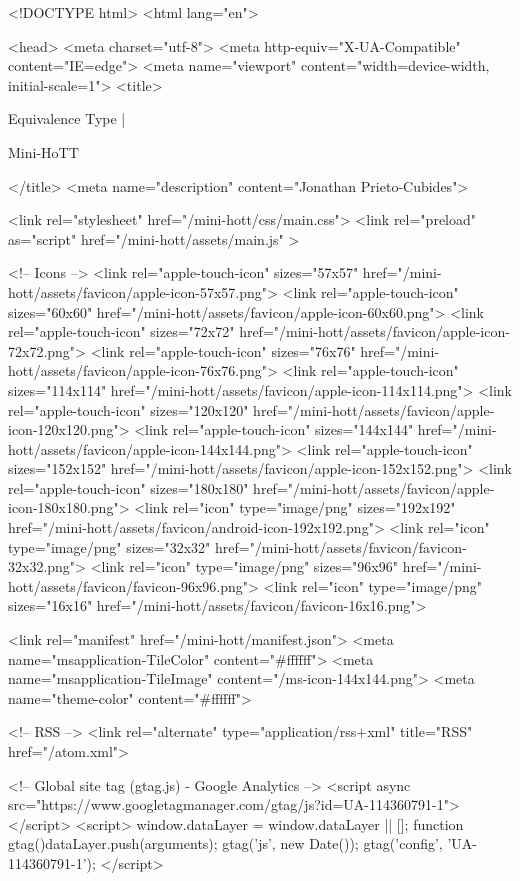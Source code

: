 <!DOCTYPE html>
<html lang="en">

<head>
  <meta charset="utf-8">
  <meta http-equiv="X-UA-Compatible" content="IE=edge">
  <meta name="viewport" content="width=device-width, initial-scale=1">
  <title>
    
      
        Equivalence Type |
      
        Mini-HoTT
    
  </title>
  <meta name="description" content="Jonathan Prieto-Cubides">

  <link rel="stylesheet" href="/mini-hott/css/main.css">
  <link rel="preload" as="script" href="/mini-hott/assets/main.js" >

  <!-- Icons -->
  <link rel="apple-touch-icon" sizes="57x57" href="/mini-hott/assets/favicon/apple-icon-57x57.png">
  <link rel="apple-touch-icon" sizes="60x60" href="/mini-hott/assets/favicon/apple-icon-60x60.png">
  <link rel="apple-touch-icon" sizes="72x72" href="/mini-hott/assets/favicon/apple-icon-72x72.png">
  <link rel="apple-touch-icon" sizes="76x76" href="/mini-hott/assets/favicon/apple-icon-76x76.png">
  <link rel="apple-touch-icon" sizes="114x114" href="/mini-hott/assets/favicon/apple-icon-114x114.png">
  <link rel="apple-touch-icon" sizes="120x120" href="/mini-hott/assets/favicon/apple-icon-120x120.png">
  <link rel="apple-touch-icon" sizes="144x144" href="/mini-hott/assets/favicon/apple-icon-144x144.png">
  <link rel="apple-touch-icon" sizes="152x152" href="/mini-hott/assets/favicon/apple-icon-152x152.png">
  <link rel="apple-touch-icon" sizes="180x180" href="/mini-hott/assets/favicon/apple-icon-180x180.png">
  <link rel="icon" type="image/png" sizes="192x192"  href="/mini-hott/assets/favicon/android-icon-192x192.png">
  <link rel="icon" type="image/png" sizes="32x32" href="/mini-hott/assets/favicon/favicon-32x32.png">
  <link rel="icon" type="image/png" sizes="96x96" href="/mini-hott/assets/favicon/favicon-96x96.png">
  <link rel="icon" type="image/png" sizes="16x16" href="/mini-hott/assets/favicon/favicon-16x16.png">

  <link rel="manifest" href="/mini-hott/manifest.json">
  <meta name="msapplication-TileColor" content="#ffffff">
  <meta name="msapplication-TileImage" content="/ms-icon-144x144.png">
  <meta name="theme-color" content="#ffffff">

  <!-- RSS -->
  <link rel="alternate" type="application/rss+xml" title="RSS" href="/atom.xml">

  <!-- Global site tag (gtag.js) - Google Analytics -->
  <script async src="https://www.googletagmanager.com/gtag/js?id=UA-114360791-1"></script>
  <script>
    window.dataLayer = window.dataLayer || [];
    function gtag(){dataLayer.push(arguments);}
    gtag('js', new Date());
    gtag('config', 'UA-114360791-1');
  </script>

